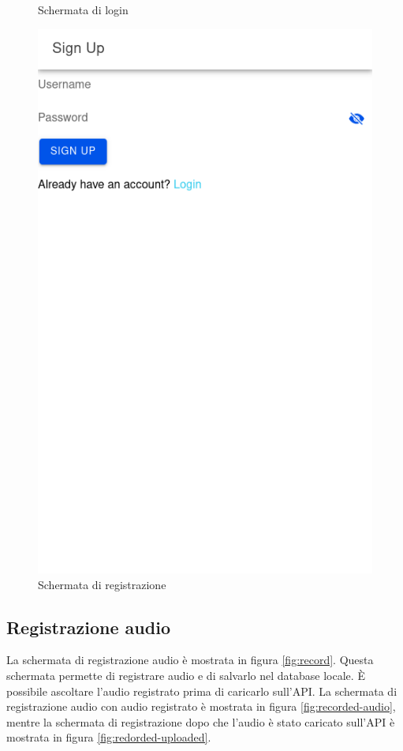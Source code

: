 \documentclass{article}
\begin{document}
\begin{figure}[H]
\begin{minipage}{0.48\textwidth}
        \centering
        \caption{Schermata di login}
        \label{fig:login}
    \end{minipage} \hfill
    \begin{minipage}{0.48\textwidth}
        \includegraphics[width=\linewidth]{signup.png}
        \centering
        \caption{Schermata di registrazione}
        \label{fig:signup}
    \end{minipage}
\end{figure}

\subsection{Registrazione audio}
La schermata di registrazione audio è mostrata in figura \ref{fig:record}. Questa schermata permette di registrare audio e di salvarlo nel database locale. È possibile ascoltare l'audio registrato prima di caricarlo sull'API. La schermata di registrazione audio con audio registrato è mostrata in figura \ref{fig:recorded-audio}, mentre la schermata di registrazione dopo che l'audio è stato caricato sull'API è mostrata in figura \ref{fig:redorded-uploaded}.
\end{document}
